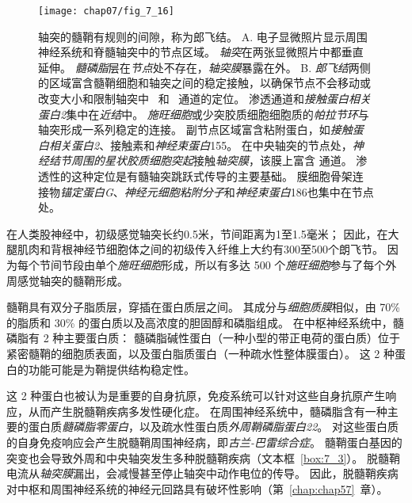 \begin{figure}[htbp]
	\centering
	\texttt{[image: chap07/fig\_7\_16]}
	\caption{轴突的髓鞘有规则的间隙，称为郎飞结。
		A. 电子显微照片显示周围神经系统和脊髓轴突中的节点区域。
		\textit{轴突}在两张显微照片中都垂直延伸。
		\textit{髓磷脂}层在\textit{节点}处不存在，\textit{轴突膜}暴露在外\cite{peters1991neuropil}。
		B. \textit{郎飞结}两侧的区域富含髓鞘细胞和轴突之间的稳定接触，以确保节点不会移动或改变大小和限制轴突中~ 和~ 通道的定位。
		渗透通道和\textit{接触蛋白相关蛋白2}集中在\textit{近结}中。
		\textit{施旺细胞}或少突胶质细胞细胞质的\textit{帕拉节环}与轴突形成一系列稳定的连接。
		副节点区域富含粘附蛋白，如\textit{接触蛋白相关蛋白2}、接触素和\textit{神经束蛋白}155。
		在中央轴突的节点处，\textit{神经结节周围的星状胶质细胞突起}接触\textit{轴突膜}，该膜上富含  通道。
		 渗透性的这种定位是有髓轴突跳跃式传导的主要基础。
		膜细胞骨架连接物\textit{锚定蛋白G}、\textit{神经元细胞粘附分子}和\textit{神经束蛋白}186也集中在节点处\cite{peles2000molecular}。}
	\label{fig:7_16}
\end{figure}


在人类股神经中，初级感觉轴突长约0.5米，节间距离为1至1.5毫米；
因此，在大腿肌肉和背根神经节细胞体之间的初级传入纤维上大约有300至500个朗飞节。
因为每个节间节段由单个\textit{施旺细胞}形成，所以有多达 500 个\textit{施旺细胞}参与了每个外周感觉轴突的髓鞘形成。


髓鞘具有双分子脂质层，穿插在蛋白质层之间。
其成分与\textit{细胞质膜}相似，由 70\% 的脂质和 30\% 的蛋白质以及高浓度的胆固醇和磷脂组成。
在中枢神经系统中，髓磷脂有 2 种主要蛋白质：
髓磷脂碱性蛋白（一种小型的带正电荷的蛋白质）位于紧密髓鞘的细胞质表面，以及蛋白脂质蛋白（一种疏水性整体膜蛋白）。
这 2 种蛋白的功能可能是为鞘提供结构稳定性。



这 2 种蛋白也被认为是重要的自身抗原，免疫系统可以针对这些自身抗原产生响应，从而产生脱髓鞘疾病多发性硬化症。
在周围神经系统中，髓磷脂含有一种主要的蛋白质\textit{髓磷脂零蛋白}，以及疏水性蛋白质\textit{外周鞘磷脂蛋白22}。
对这些蛋白质的自身免疫响应会产生脱髓鞘周围神经病，即\textit{古兰-巴雷综合症}。
髓鞘蛋白基因的突变也会导致外周和中央轴突发生多种脱髓鞘疾病（文本框~\ref{box:7_3}）。
脱髓鞘电流从\textit{轴突膜}漏出，会减慢甚至停止轴突中动作电位的传导。
因此，脱髓鞘疾病对中枢和周围神经系统的神经元回路具有破坏性影响（第~\ref{chap:chap57}~章）。


